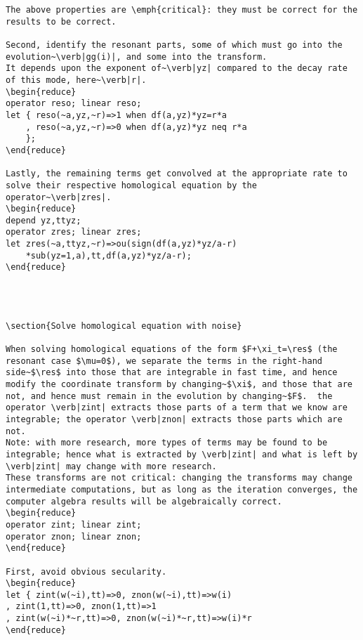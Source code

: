 \documentclass[11pt,a5paper]{article}
\newcommand{\res}{\operatorname{Res}}
\begin{document}
\begin{reduce}
\begin{verbatim}
The above properties are \emph{critical}: they must be correct for the results to be correct.

Second, identify the resonant parts, some of which must go into the evolution~\verb|gg(i)|, and some into the transform.
It depends upon the exponent of~\verb|yz| compared to the decay rate of this mode, here~\verb|r|.
\begin{reduce}
operator reso; linear reso;
let { reso(~a,yz,~r)=>1 when df(a,yz)*yz=r*a
    , reso(~a,yz,~r)=>0 when df(a,yz)*yz neq r*a
    };
\end{reduce}

Lastly, the remaining terms get convolved at the appropriate rate to solve their respective homological equation by the operator~\verb|zres|.
\begin{reduce}
depend yz,ttyz;
operator zres; linear zres;
let zres(~a,ttyz,~r)=>ou(sign(df(a,yz)*yz/a-r)
    *sub(yz=1,a),tt,df(a,yz)*yz/a-r);
\end{reduce}




\section{Solve homological equation with noise}

When solving homological equations of the form $F+\xi_t=\res$ (the resonant case $\mu=0$), we separate the terms in the right-hand side~$\res$ into those that are integrable in fast time, and hence modify the coordinate transform by changing~$\xi$, and those that are not, and hence must remain in the evolution by changing~$F$.  the operator \verb|zint| extracts those parts of a term that we know are integrable; the operator \verb|znon| extracts those parts which are not.
Note: with more research, more types of terms may be found to be integrable; hence what is extracted by \verb|zint| and what is left by \verb|zint| may change with more research.
These transforms are not critical: changing the transforms may change intermediate computations, but as long as the iteration converges, the computer algebra results will be algebraically correct.
\begin{reduce}
operator zint; linear zint;
operator znon; linear znon;
\end{reduce}

First, avoid obvious secularity.
\begin{reduce}
let { zint(w(~i),tt)=>0, znon(w(~i),tt)=>w(i)
, zint(1,tt)=>0, znon(1,tt)=>1
, zint(w(~i)*~r,tt)=>0, znon(w(~i)*~r,tt)=>w(i)*r
\end{reduce}


\end{verbatim}
\end{reduce}
\end{document}
